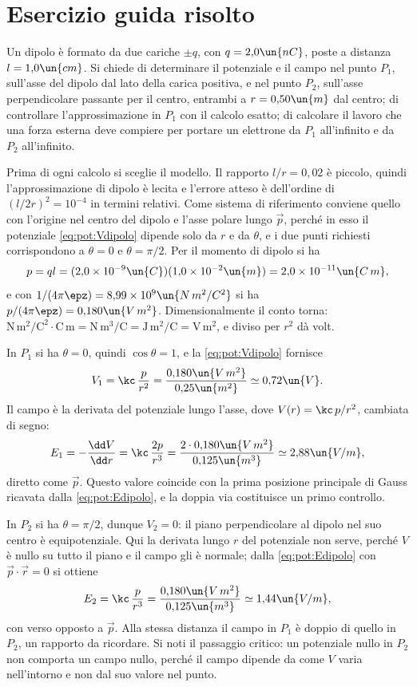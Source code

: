 \documentclass[main.tex]{subfiles}
\begin{document}
	\section*{Esercizio guida risolto}
	
	Un dipolo è formato da due cariche $\pm q$, con $q=2{,}0\un{nC}$, poste a distanza $l=1{,}0\un{cm}$. Si chiede di determinare il potenziale e il campo nel punto $P_1$, sull'asse del dipolo dal lato della carica positiva, e nel punto $P_2$, sull'asse perpendicolare passante per il centro, entrambi a $r=0{,}50\un{m}$ dal centro; di controllare l'approssimazione in $P_1$ con il calcolo esatto; di calcolare il lavoro che una forza esterna deve compiere per portare un elettrone da $P_1$ all'infinito e da $P_2$ all'infinito.
	
	Prima di ogni calcolo si sceglie il modello. Il rapporto $l/r=0{,}02$ è piccolo, quindi l'approssimazione di dipolo è lecita e l'errore atteso è dell'ordine di $(l/2r)^2=10^{-4}$ in termini relativi. Come sistema di riferimento conviene quello con l'origine nel centro del dipolo e l'asse polare lungo $\vec p$, perché in esso il potenziale \eqref{eq:pot:Vdipolo} dipende solo da $r$ e da $\theta$, e i due punti richiesti corrispondono a $\theta=0$ e $\theta=\pi/2$. Per il momento di dipolo si ha
	\[
	p=ql=(2{,}0\times10^{-9}\un{C})(1{,}0\times10^{-2}\un{m})=2{,}0\times10^{-11}\un{C\,m},
	\]
	e con $1/(4\pi\epz)=8{,}99\times10^{9}\un{N\,m^2/C^2}$ si ha $p/(4\pi\epz)=0{,}180\un{V\,m^2}$. Dimensionalmente il conto torna: $\mathrm{N\,m^2/C^2}\cdot\mathrm{C\,m}=\mathrm{N\,m^3/C}=\mathrm{J\,m^2/C}=\mathrm{V\,m^2}$, e diviso per $r^2$ dà volt.
	
	In $P_1$ si ha $\theta=0$, quindi $\cos\theta=1$, e la \eqref{eq:pot:Vdipolo} fornisce
	\[
	V_1=\kc\,\frac{p}{r^2}=\frac{0{,}180\un{V\,m^2}}{0{,}25\un{m^2}}\simeq0{,}72\un{V}.
	\]
	Il campo è la derivata del potenziale lungo l'asse, dove $V(r)=\kc\,p/r^2$, cambiata di segno:
	\[
	E_1=-\frac{\dd V}{\dd r}=\kc\,\frac{2p}{r^3}=\frac{2\cdot0{,}180\un{V\,m^2}}{0{,}125\un{m^3}}\simeq2{,}88\un{V/m},
	\]
	diretto come $\vec p$. Questo valore coincide con la prima posizione principale di Gauss ricavata dalla \eqref{eq:pot:Edipolo}, e la doppia via costituisce un primo controllo.
	
	In $P_2$ si ha $\theta=\pi/2$, dunque $V_2=0$: il piano perpendicolare al dipolo nel suo centro è equipotenziale. Qui la derivata lungo $r$ del potenziale non serve, perché $V$ è nullo su tutto il piano e il campo gli è normale; dalla \eqref{eq:pot:Edipolo} con $\vec p\cdot\vec r=0$ si ottiene
	\[
	E_2=\kc\,\frac{p}{r^3}=\frac{0{,}180\un{V\,m^2}}{0{,}125\un{m^3}}\simeq1{,}44\un{V/m},
	\]
	con verso opposto a $\vec p$. Alla stessa distanza il campo in $P_1$ è doppio di quello in $P_2$, un rapporto da ricordare. Si noti il passaggio critico: un potenziale nullo in $P_2$ non comporta un campo nullo, perché il campo dipende da come $V$ varia nell'intorno e non dal suo valore nel punto.
	
\end{document}
